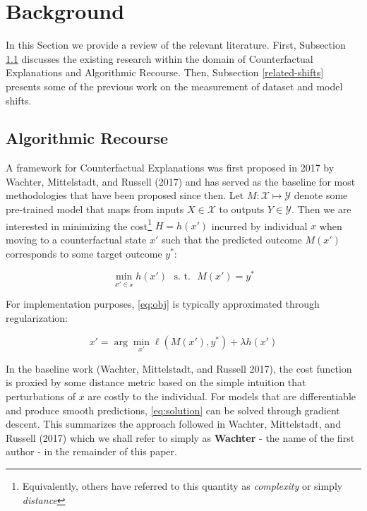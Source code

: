 \documentclass[conference,final,]{IEEEtran}
\begin{document}
\hypertarget{related}{%
\section{Background}\label{related}}

In this Section we provide a review of the relevant literature. First, Subsection \ref{related-recourse} discusses the existing research within the domain of Counterfactual Explanations and Algorithmic Recourse. Then, Subsection \ref{related-shifts} presents some of the previous work on the measurement of dataset and model shifts.

\hypertarget{related-recourse}{%
\subsection{Algorithmic Recourse}\label{related-recourse}}

A framework for Counterfactual Explanations was first proposed in 2017 by Wachter, Mittelstadt, and Russell (2017) and has served as the baseline for most methodologies that have been proposed since then. Let \(M: \mathcal{X} \mapsto \mathcal{Y}\) denote some pre-trained model that maps from inputs \(X \in \mathcal{X}\) to outputs \(Y \in \mathcal{Y}\). Then we are interested in minimizing the cost\footnote{Equivalently, others have referred to this quantity as \emph{complexity} or simply \emph{distance}} \(H=h(x\prime)\) incurred by individual \(x\) when moving to a counterfactual state \(x\prime\) such that the predicted outcome \(M(x\prime)\) corresponds to some target outcome \(y^*\):

\begin{equation}
\min_{x\prime \in \mathcal{x}} h(x\prime) \ \ \ \mbox{s. t.} \ \ \ M(x\prime) = y^* \label{eq:obj}
\end{equation}

For implementation purposes, \eqref{eq:obj} is typically approximated through regularization:

\begin{equation}
x\prime = \arg \min_{x\prime}  \ell(M(x\prime),y^*) + \lambda h(x\prime) \label{eq:solution}
\end{equation}

In the baseline work (Wachter, Mittelstadt, and Russell 2017), the cost function is proxied by some distance metric based on the simple intuition that perturbations of \(x\) are costly to the individual. For models that are differentiable and produce smooth predictions, \eqref{eq:solution} can be solved through gradient descent. This summarizes the approach followed in Wachter, Mittelstadt, and Russell (2017) which we shall refer to simply as \textbf{Wachter} - the name of the first author - in the remainder of this paper.
\end{document}
